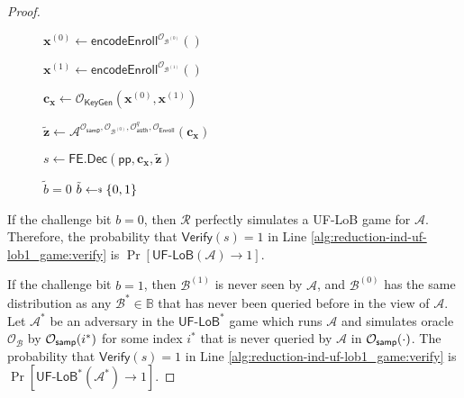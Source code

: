 \begin{proof}
\begin{figure}[h]
\begin{minipage}[t]{0.5\linewidth}
\begin{algorithm}[H]
\begin{algorithmic}[1]
		\State $\mathbf{x}^{(0)} \gets \textsf{encodeEnroll}^{\mathcal{O}_{\mathcal{B}^{(0)}}}()$

		\State $\mathbf{x}^{(1)} \gets \textsf{encodeEnroll}^{\mathcal{O}_{\mathcal{B}^{(1)}}}()$

		\State $\mathbf{c_x} \gets \mathcal{O}_{\textsf{KeyGen}}(\mathbf{x}^{(0)}, \mathbf{x}^{(1)})$

		\State ${\mathbf{\tilde{z}}} \gets \mathcal{A}^{\mathcal{O}_{\textsf{samp}}, \mathcal{O}_{\mathcal{B}^{(0)}}, \mathcal{O}_\textsf{auth}^q, \mathcal{O}_{\textsf{Enroll}} } ( \mathbf{c_x})$

		\State $s \gets \textsf{FE.Dec}( \textsf{pp}, \mathbf{c_x}, \mathbf{\tilde{z}} )$

		 \label{alg:reduction-ind-uf-lob1_game:verify}
			\State \Return $\tilde{b} = 0$
		\Else
			\State \Return $\tilde{b} \getsdollar \{0, 1\}$
		\EndIf

	\end{algorithmic}
	\end{algorithm}
	\end{minipage}
	
\label{fig:reduction-ind-uf-lob1_game}
\end{figure}

If the challenge bit $b = 0$, then $\mathcal{R}$ perfectly simulates a \textsf{UF-LoB} game for $\mathcal{A}$. Therefore, the probability that $\textsf{Verify}(s) = 1$ in Line \ref{alg:reduction-ind-uf-lob1_game:verify} is $\Pr[\textsf{UF-LoB}(\mathcal{A}) \to 1]$.

If the challenge bit $b = 1$, then $\mathcal{B}^{(1)}$ is never seen by $\mathcal{A}$, and $\mathcal{B}^{(0)}$ has the same distribution as any $\mathcal{B}^* \in \mathbb{B}$ that has never been queried before in the view of $\mathcal{A}$. Let $\mathcal{A}^*$ be an adversary in the $\textsf{UF-LoB}^*$ game which runs $\mathcal{A}$ and simulates oracle $\mathcal{O}_{\mathcal{B}}$ by $\mathcal{O}_{\sf samp}(i^*)$ for some index $i^*$ that is never queried by $\mathcal{A}$ in $\mathcal{O}_{\sf samp}(\cdot)$. The probability that $\textsf{Verify}(s) = 1$ in Line \ref{alg:reduction-ind-uf-lob1_game:verify} is $\Pr[ \textsf{UF-LoB}^*(\mathcal{A}^*) \to 1 ]$.


\end{proof}
